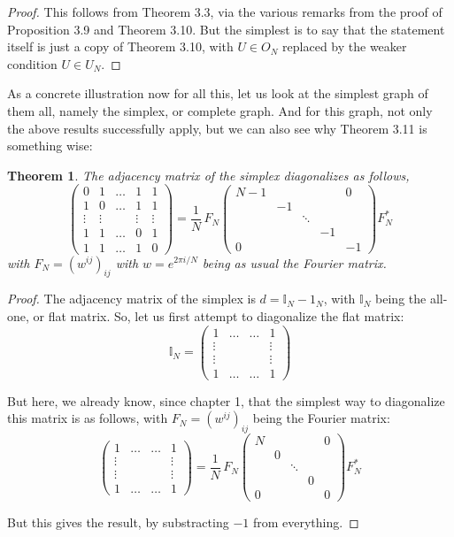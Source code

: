 \documentclass[12pt]{amsbook}
\newtheorem{theorem}{Theorem}[chapter]
\begin{document}
\begin{proof}
This follows from Theorem 3.3, via the various remarks from the proof of Proposition 3.9 and Theorem 3.10. But the simplest is to say that the statement itself is just a copy of Theorem 3.10, with $U\in O_N$ replaced by the weaker condition $U\in U_N$.
\end{proof}

As a concrete illustration now for all this, let us look at the simplest graph of them all, namely the simplex, or complete graph. And for this graph, not only the above results successfully apply, but we can also see why Theorem 3.11 is something wise:


\begin{theorem}
The adjacency matrix of the simplex diagonalizes as follows,
$$\begin{pmatrix}
0&1&\ldots&1&1\\
1&0&\ldots&1&1\\
\vdots&\vdots&&\vdots&\vdots\\
1&1&\ldots&0&1\\
1&1&\ldots&1&0
\end{pmatrix}
=\frac{1}{N}\,F_N
\begin{pmatrix}
N-1&&&&0\\
&-1\\
&&\ddots&\\
&&&-1\\
0&&&&-1
\end{pmatrix}F_N^*$$
with $F_N=(w^{ij})_{ij}$ with $w=e^{2\pi i/N}$ being as usual the Fourier matrix.
\end{theorem}

\begin{proof}
The adjacency matrix of the simplex is $d=\mathbb I_N-1_N$, with $\mathbb I_N$ being the all-one, or flat matrix. So, let us first attempt to diagonalize the flat matrix:
$$\mathbb I_N=\begin{pmatrix}
1&\ldots&\ldots&1\\
\vdots&&&\vdots\\
\vdots&&&\vdots\\
1&\ldots&\ldots&1\end{pmatrix}$$

But here, we already know, since chapter 1, that the simplest way to diagonalize this matrix is as follows, with $F_N=(w^{ij})_{ij}$ being the Fourier matrix:
$$\begin{pmatrix}
1&\ldots&\ldots&1\\
\vdots&&&\vdots\\
\vdots&&&\vdots\\
1&\ldots&\ldots&1\end{pmatrix}
=\frac{1}{N}\,F_N
\begin{pmatrix}
N&&&&0\\
&0\\
&&\ddots\\
&&&0\\
0&&&&0\end{pmatrix}F_N^*$$

But this gives the result, by substracting $-1$ from everything.
\end{proof}
\end{document}
